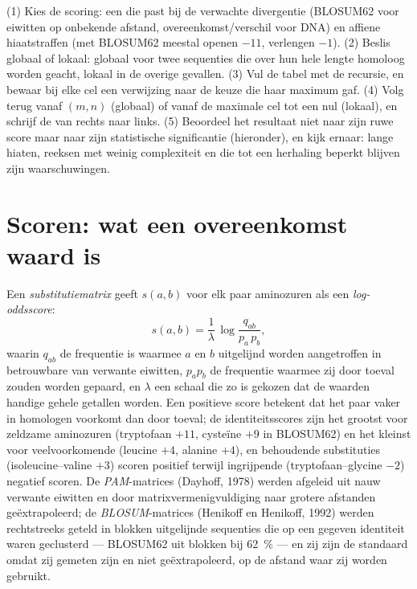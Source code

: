 \begin{method}\label{met:b3:bioinformatics:align}
(1) Kies de scoring: een  die past bij de verwachte
divergentie (BLOSUM62 voor eiwitten op onbekende afstand,
overeenkomst/verschil voor DNA) en affiene hiaatstraffen (met BLOSUM62
meestal openen $-11$, verlengen $-1$). (2) Beslis globaal of lokaal:
globaal voor twee sequenties die over hun hele lengte homoloog worden
geacht, lokaal in de overige gevallen. (3) Vul de tabel met de
recursie, en bewaar bij elke cel een verwijzing naar de keuze die haar
maximum gaf. (4) Volg terug vanaf $(m,n)$ (globaal) of vanaf de
maximale cel tot een nul (lokaal), en schrijf de  van rechts
naar links. (5) Beoordeel het resultaat niet naar zijn ruwe score maar
naar zijn statistische significantie (hieronder), en kijk ernaar: lange
hiaten, reeksen met weinig complexiteit en  die tot een
herhaling beperkt blijven zijn waarschuwingen.
\end{method}

\section{Scoren: wat een overeenkomst waard is}

\begin{definition}[Substitutiematrices]\label{def:b3:bioinformatics:matrices}
Een \emph{substitutiematrix} geeft $s(a,b)$ voor elk paar aminozuren als
een \emph{log-oddsscore}:
\[
s(a,b) = \frac{1}{\lambda}\,\log\frac{q_{ab}}{p_{a}\,p_{b}},
\]
waarin $q_{ab}$ de frequentie is waarmee $a$ en $b$ uitgelijnd worden
aangetroffen in betrouwbare  van verwante eiwitten,
$p_{a} p_{b}$ de frequentie waarmee zij door toeval zouden worden
gepaard, en $\lambda$ een schaal die zo is gekozen dat de waarden
handige gehele getallen worden. Een positieve score betekent dat het
paar vaker in homologen voorkomt dan door toeval; de identiteitsscores
zijn het grootst voor zeldzame aminozuren (tryptofaan $+11$, cysteïne
$+9$ in BLOSUM62) en het kleinst voor veelvoorkomende (leucine $+4$,
alanine $+4$), en behoudende substituties (isoleucine--valine $+3$)
scoren positief terwijl ingrijpende (tryptofaan--glycine $-2$) negatief
scoren. De \emph{PAM}-matrices (Dayhoff, 1978) werden afgeleid uit nauw
verwante eiwitten en door matrixvermenigvuldiging naar grotere
afstanden geëxtrapoleerd; de \emph{BLOSUM}-matrices (Henikoff en
Henikoff, 1992) werden rechtstreeks geteld in blokken uitgelijnde
sequenties die op een gegeven identiteit waren geclusterd --- BLOSUM62
uit blokken bij \qty{62}{\%} --- en zij zijn de standaard omdat zij
gemeten zijn en niet geëxtrapoleerd, op de afstand waar zij worden
gebruikt.
\end{definition}


